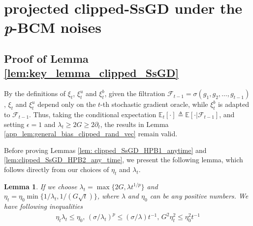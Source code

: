 \documentclass{article}
\newtheorem{lemma}{Lemma}
\def \E {\mathbb{E}}
\begin{document}
\section{projected clipped-SsGD under the \textit{p}-BCM noises}
\subsection{Proof of Lemma \ref{lem:key_lemma_clipped_SsGD}}
By the definitions of $\xi_t$, $\xi_t^u$ and $\xi_t^b$, given the filtration $\mathcal{F}_{t-1} = \sigma(g_1, g_2, \dots, g_{t-1})$, $\xi_t$ and $\xi_t^u$ depend only on the $t$-th stochastic gradient oracle, while $\xi_t^b$ is adapted to $\mathcal{F}_{t-1}$. Thus, taking the conditional expectation $\E_t[\cdot] \triangleq \E[\cdot|\mathcal{F}_{t-1}]$, and setting $\epsilon = 1$ and $\lambda_t \geq 2G \geq 2\partial_t$, the results in Lemma \ref{app_lem:general_bias_clipped_rand_vec} remain valid.

Before proving Lemmas \ref{lem: clipped_SsGD_HPB1_anytime} and \ref{lem:clipped_SsGD_HPB2_any_time}, we present the following lemma, which follows directly from our choices of $\eta_t$ and $\lambda_t$.

\begin{lemma}\label{app_lem:eta_lambda_choice_clipped_SsGD}
    If we choose $\lambda_t=\max\{2G,\lambda t^{1/p}\}$ and $\eta_t=\eta_0\min\{1/\lambda_t,1/(G\sqrt{t})\}$, where $\lambda$ and $\eta_0$ can be any positive numbers. We have following inequalities
    \begin{align}
        \eta_t\lambda_t\leq\eta_0,\,(\sigma/\lambda_t)^p\leq (\sigma/\lambda)t^{-1},\, G^2\eta_t^2\leq \eta_0^2t^{-1}
    \end{align}
\end{lemma}
\end{document}
